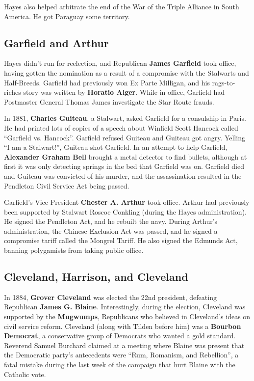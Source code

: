 Hayes also helped arbitrate the end of the War of the Triple Alliance in South America.
He got Paraguay some territory.

\subsection*{Garfield and Arthur}

Hayes didn't run for reelection, and Republican \textbf{James Garfield} took office,
having gotten the nomination as a result of a compromise with the Stalwarts and Half-Breeds.
Garfield had previously won Ex Parte Milligan,
and his rags-to-riches story was written by \textbf{Horatio Alger}.
While in office, Garfield had Postmaster General Thomas James investigate the Star Route frauds.

In 1881, \textbf{Charles Guiteau}, a Stalwart, asked Garfield for a consulship in Paris.
He had printed lots of copies of a speech about Winfield Scott Hancock called ``Garfield vs. Hancock''.
Garfield refused Guiteau and Guiteau got angry.
Yelling ``I am a Stalwart!'', Guiteau shot Garfield.
In an attempt to help Garfield, \textbf{Alexander Graham Bell} brought a metal detector to find bullets,
although at first it was only detecting springs in the bed that Garfield was on.
Garfield died and Guiteau was convicted of his murder,
and the assassination resulted in the Pendleton Civil Service Act being passed.

Garfield's Vice President \textbf{Chester A. Arthur} took office.
Arthur had previously been supported by Stalwart Roscoe Conkling (during the Hayes administration).
He signed the Pendleton Act, and he rebuilt the navy.
During Arthur's administration, the Chinese Exclusion Act was passed,
and he signed a compromise tariff called the Mongrel Tariff.
He also signed the Edmunds Act, banning polygamists from taking public office.

\subsection*{Cleveland, Harrison, and Cleveland}

In 1884, \textbf{Grover Cleveland} was elected the 22nd president,
defeating Republican \textbf{James G. Blaine}.
Interestingly, during the election, Cleveland was supported by the \textbf{Mugwumps},
Republicans who believed in Cleveland's ideas on civil service reform.
Cleveland (along with Tilden before him) was a \textbf{Bourbon Democrat},
a conservative group of Democrats who wanted a gold standard.
Reverend Samuel Burchard claimed at a meeting where Blaine was present that
the Democratic party's antecedents were ``Rum, Romanism, and Rebellion'',
a fatal mistake during the last week of the campaign that hurt Blaine with the Catholic vote.

